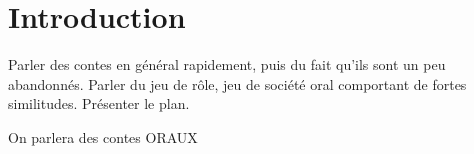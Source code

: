 \section{Introduction}

Parler des contes en général rapidement, puis du fait qu'ils sont un peu abandonnés. Parler du jeu de rôle, jeu de société oral comportant de fortes similitudes.
Présenter le plan.

On parlera des contes ORAUX


\clearpage
